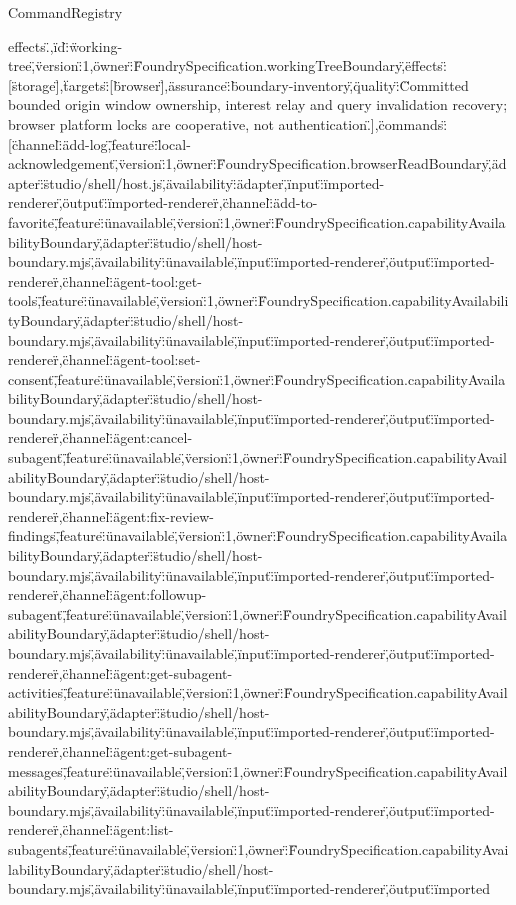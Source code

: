 \begin{lexlean}{CommandRegistry}
\begin{semanticmodule}
{effects.\"},{\"id\":\"working-tree\",\"version\":1,\"owner\":\"FoundrySpecification.workingTreeBoundary\",\"effects\":[\"storage\"],\"targets\":[\"browser\"],\"assurance\":\"boundary-inventory\",\"quality\":\"Committed bounded origin window ownership, interest relay and query invalidation recovery; browser platform locks are cooperative, not authentication.\"}],\"commands\":[{\"channel\":\"add-log\",\"feature\":\"local-acknowledgement\",\"version\":1,\"owner\":\"FoundrySpecification.browserReadBoundary\",\"adapter\":\"studio/shell/host.js\",\"availability\":\"adapter\",\"input\":\"imported-renderer\",\"output\":\"imported-renderer\"},{\"channel\":\"add-to-favorite\",\"feature\":\"unavailable\",\"version\":1,\"owner\":\"FoundrySpecification.capabilityAvailabilityBoundary\",\"adapter\":\"studio/shell/host-boundary.mjs\",\"availability\":\"unavailable\",\"input\":\"imported-renderer\",\"output\":\"imported-renderer\"},{\"channel\":\"agent-tool:get-tools\",\"feature\":\"unavailable\",\"version\":1,\"owner\":\"FoundrySpecification.capabilityAvailabilityBoundary\",\"adapter\":\"studio/shell/host-boundary.mjs\",\"availability\":\"unavailable\",\"input\":\"imported-renderer\",\"output\":\"imported-renderer\"},{\"channel\":\"agent-tool:set-consent\",\"feature\":\"unavailable\",\"version\":1,\"owner\":\"FoundrySpecification.capabilityAvailabilityBoundary\",\"adapter\":\"studio/shell/host-boundary.mjs\",\"availability\":\"unavailable\",\"input\":\"imported-renderer\",\"output\":\"imported-renderer\"},{\"channel\":\"agent:cancel-subagent\",\"feature\":\"unavailable\",\"version\":1,\"owner\":\"FoundrySpecification.capabilityAvailabilityBoundary\",\"adapter\":\"studio/shell/host-boundary.mjs\",\"availability\":\"unavailable\",\"input\":\"imported-renderer\",\"output\":\"imported-renderer\"},{\"channel\":\"agent:fix-review-findings\",\"feature\":\"unavailable\",\"version\":1,\"owner\":\"FoundrySpecification.capabilityAvailabilityBoundary\",\"adapter\":\"studio/shell/host-boundary.mjs\",\"availability\":\"unavailable\",\"input\":\"imported-renderer\",\"output\":\"imported-renderer\"},{\"channel\":\"agent:followup-subagent\",\"feature\":\"unavailable\",\"version\":1,\"owner\":\"FoundrySpecification.capabilityAvailabilityBoundary\",\"adapter\":\"studio/shell/host-boundary.mjs\",\"availability\":\"unavailable\",\"input\":\"imported-renderer\",\"output\":\"imported-renderer\"},{\"channel\":\"agent:get-subagent-activities\",\"feature\":\"unavailable\",\"version\":1,\"owner\":\"FoundrySpecification.capabilityAvailabilityBoundary\",\"adapter\":\"studio/shell/host-boundary.mjs\",\"availability\":\"unavailable\",\"input\":\"imported-renderer\",\"output\":\"imported-renderer\"},{\"channel\":\"agent:get-subagent-messages\",\"feature\":\"unavailable\",\"version\":1,\"owner\":\"FoundrySpecification.capabilityAvailabilityBoundary\",\"adapter\":\"studio/shell/host-boundary.mjs\",\"availability\":\"unavailable\",\"input\":\"imported-renderer\",\"output\":\"imported-renderer\"},{\"channel\":\"agent:list-subagents\",\"feature\":\"unavailable\",\"version\":1,\"owner\":\"FoundrySpecification.capabilityAvailabilityBoundary\",\"adapter\":\"studio/shell/host-boundary.mjs\",\"availability\":\"unavailable\",\"input\":\"imported-renderer\",\"output\":\"imported}
\end{semanticmodule}
\end{lexlean}
